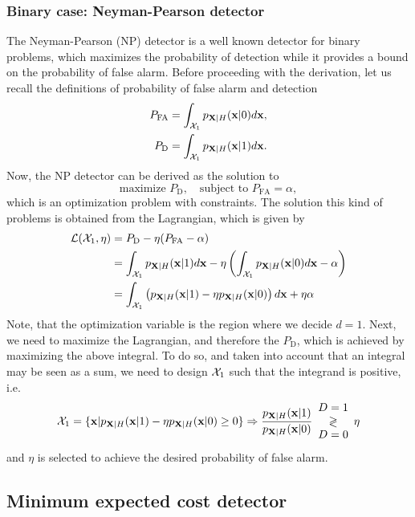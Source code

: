 \subsubsection{Binary case: Neyman-Pearson detector}

The Neyman-Pearson (NP) detector is a well known detector for binary problems, which maximizes the probability of detection while it provides a bound on the probability of false alarm. Before proceeding with the derivation, let us recall the definitions of probability of false alarm and detection
\begin{align}
P_\text{FA} & = \int_{{\cal X}_1} p_{{\bf X}|H}({\bf x}|0) d{\bf x}, \nonumber \\
P_\text{D} & = \int_{{\cal X}_1} p_{{\bf X}|H}({\bf x}|1) d{\bf x}. \nonumber
\end{align}
Now, the NP detector can be derived as the solution to
\begin{equation*}
	\text{maximize } P_\text{D}, \quad \text{subject to } P_\text{FA} = \alpha,
\end{equation*}
which is an optimization problem with constraints. The solution this kind of problems is obtained from the Lagrangian, which is given by
\begin{align}
\mathcal{L}(\mathcal{X}_1,\eta) &= P_\text{D} - \eta (P_\text{FA} - \alpha) \nonumber \\
&= \int_{{\cal X}_1} p_{{\bf X}|H}({\bf x}|1) d{\bf x}  - \eta \left(\int_{{\cal X}_1} p_{{\bf X}|H}({\bf x}|0) d{\bf x} - \alpha \right) \nonumber \\
&= \int_{\mathcal{X}_1} \left( p_{{\bf X}|H}({\bf x}|1) - \eta p_{{\bf X}|H}({\bf x}|0)  \right) d  {\bf x} + \eta \alpha \nonumber
\end{align}
Note, that the optimization variable is the region where we decide $d=1$. Next, we need to maximize the Lagrangian, and therefore the $P_\text{D}$, which is achieved by maximizing the above integral. To do so, and taken into account that an integral may be seen as a sum, we need to design ${\cal X}_1$ such that the integrand is positive, i.e.
\begin{equation*}
	\mathcal{X}_1 = \{\mathbf{x} |p_{{\bf X}|H}({\bf x}|1) - \eta p_{{\bf X}|H}({\bf x}|0) \geq 0 \} \Rightarrow \frac{p_{{\bf X}|H}({\bf x}|1)}{p_{{\bf X}|H}({\bf x}|0)} \begin{array}{c} D=1 \\ \gtrless \\ D=0 \end{array} \eta
\end{equation*}
and $\eta$ is selected to achieve the desired probability of false alarm.

\subsection{Minimum expected cost detector}

